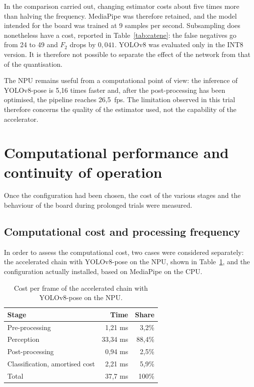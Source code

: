 In the comparison carried out, changing estimator costs about five times more than halving the frequency. MediaPipe was therefore retained, and the model intended for the board was trained at 9 samples per second.
Subsampling does nonetheless have a cost, reported in Table~\ref{tab:catene}: the false negatives go from 24 to 49 and $F_2$ drops by $0{,}041$. YOLOv8 was evaluated only in the INT8 version. It is therefore not possible to separate the effect of the network from that of the quantisation.

The NPU remains useful from a computational point of view: the inference of YOLOv8-pose is 5,16 times faster and, after the post-processing has been optimised, the pipeline reaches 26,5~fps. The limitation observed in this trial therefore concerns the quality of the estimator used, not the capability of the accelerator.

\section{Computational performance and continuity of operation}

Once the configuration had been chosen, the cost of the various stages and the behaviour of the board during prolonged trials were measured.

\subsection{Computational cost and processing frequency}
\label{sec:costo-computazionale}

In order to assess the computational cost, two cases were considered separately: the accelerated chain with YOLOv8-pose on the NPU, shown in Table~\ref{tab:costo}, and the configuration actually installed, based on MediaPipe on the CPU.

\begin{table}[htbp]
\centering
\caption{Cost per frame of the accelerated chain with YOLOv8-pose on the NPU.}
\label{tab:costo}
\begin{tabular}{lrr}
\toprule
\textbf{Stage} & \textbf{Time} & \textbf{Share} \\
\midrule
Pre-processing & 1,21 ms & 3,2\% \\
Perception & 33,34 ms & 88,4\% \\
Post-processing & 0,94 ms & 2,5\% \\
Classification, amortised cost & 2,21 ms & 5,9\% \\
\midrule
Total & 37,7 ms & 100\% \\
\bottomrule
\end{tabular}
\end{table}

